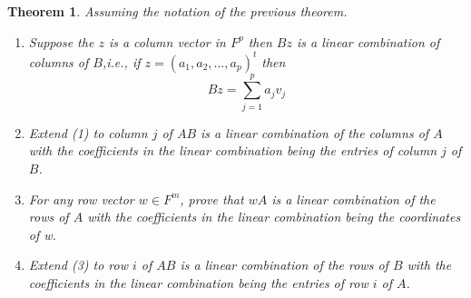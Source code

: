\documentclass[12pt, a4paper]{article}
\newtheorem{theorem}{Theorem}[section]
\theoremstyle{definition}
\theoremstyle{remark}
\begin{document}
\begin{theorem}
    Assuming the notation of the previous theorem.
    \begin{enumerate}
        \item Suppose the $z$ is a column vector in $F^p$ then $Bz$ is a linear combination of columns of $B$,\textit{i.e.}, if $z = (a_1,a_2,\ldots,a_p)^t$ then 
        \[Bz = \sum_{j=1}^p a_jv_j\]
        \item Extend (1) to column $j$ of $AB$ is a linear combination of the columns of $A$ with the coefficients in the linear combination being the entries of column $j$ of $B$.
        \item For any row vector $w \in F^m$, prove that $wA$ is a linear combination of the rows of $A$ with the coefficients in the linear combination being the coordinates of w.
        \item Extend (3) to row $i$ of $AB$ is a linear combination of the rows of $B$ with the coefficients in the linear combination being the entries of row $i$ of $A$.
    \end{enumerate}
\end{theorem}
\end{document}
